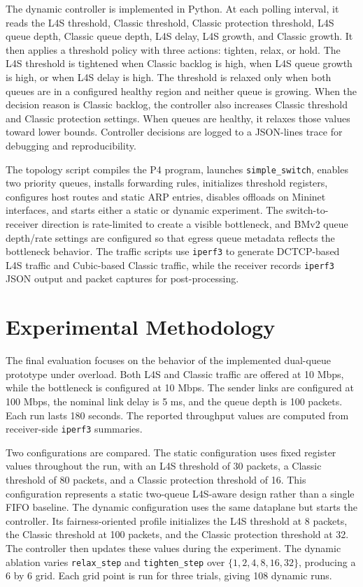 \documentclass[10pt]{article}
\begin{document}
The dynamic controller is implemented in Python. At each polling interval, it reads the L4S threshold, Classic threshold, Classic protection threshold, L4S queue depth, Classic queue depth, L4S delay, L4S growth, and Classic growth. It then applies a threshold policy with three actions: tighten, relax, or hold. The L4S threshold is tightened when Classic backlog is high, when L4S queue growth is high, or when L4S delay is high. The threshold is relaxed only when both queues are in a configured healthy region and neither queue is growing. When the decision reason is Classic backlog, the controller also increases Classic threshold and Classic protection settings. When queues are healthy, it relaxes those values toward lower bounds. Controller decisions are logged to a JSON-lines trace for debugging and reproducibility.

The topology script compiles the P4 program, launches \texttt{simple\_switch}, enables two priority queues, installs forwarding rules, initializes threshold registers, configures host routes and static ARP entries, disables offloads on Mininet interfaces, and starts either a static or dynamic experiment. The switch-to-receiver direction is rate-limited to create a visible bottleneck, and BMv2 queue depth/rate settings are configured so that egress queue metadata reflects the bottleneck behavior. The traffic scripts use \texttt{iperf3} to generate DCTCP-based L4S traffic and Cubic-based Classic traffic, while the receiver records \texttt{iperf3} JSON output and packet captures for post-processing.

\section{Experimental Methodology}

The final evaluation focuses on the behavior of the implemented dual-queue prototype under overload. Both L4S and Classic traffic are offered at 10 Mbps, while the bottleneck is configured at 10 Mbps. The sender links are configured at 100 Mbps, the nominal link delay is 5 ms, and the queue depth is 100 packets. Each run lasts 180 seconds. The reported throughput values are computed from receiver-side \texttt{iperf3} summaries.

Two configurations are compared. The static configuration uses fixed register values throughout the run, with an L4S threshold of 30 packets, a Classic threshold of 80 packets, and a Classic protection threshold of 16. This configuration represents a static two-queue L4S-aware design rather than a single FIFO baseline. The dynamic configuration uses the same dataplane but starts the controller. Its fairness-oriented profile initializes the L4S threshold at 8 packets, the Classic threshold at 100 packets, and the Classic protection threshold at 32. The controller then updates these values during the experiment. The dynamic ablation varies \texttt{relax\_step} and \texttt{tighten\_step} over $\{1,2,4,8,16,32\}$, producing a 6 by 6 grid. Each grid point is run for three trials, giving 108 dynamic runs.
\end{document}
